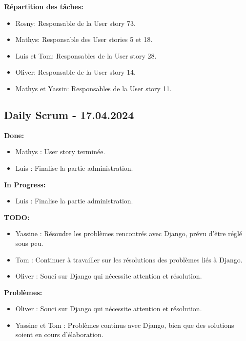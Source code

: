 \documentclass[11pt]{article}
\begin{document}
\textbf{Répartition des tâches:}
\begin{itemize}
    \item Rosny: Responsable de la User story 73.
    \item Mathys: Responsable des User stories 5 et 18.
    \item Luis et Tom: Responsables de la User story 28.
    \item Oliver: Responsable de la User story 14.
    \item Mathys et Yassin: Responsables de la User story 11.
\end{itemize}


\subsection*{{\color{navy}Daily Scrum - 17.04.2024}}

\textbf{Done:}
\begin{itemize}
  \item Mathys : User story terminée.
  \item Luis : Finalise la partie administration.
\end{itemize}

\textbf{In Progress:}
\begin{itemize}
  \item Luis : Finalise la partie administration.
\end{itemize}

\textbf{TODO:}
\begin{itemize}
  \item Yassine : Résoudre les problèmes rencontrés avec Django, prévu d'être réglé sous peu.
  \item Tom : Continuer à travailler sur les résolutions des problèmes liés à Django.
  \item Oliver : Souci sur Django qui nécessite attention et résolution.
\end{itemize}

\textbf{Problèmes:}
\begin{itemize}
  \item Oliver : Souci sur Django qui nécessite attention et résolution.
  \item Yassine et Tom : Problèmes continus avec Django, bien que des solutions soient en cours d'élaboration.
\end{itemize}
\end{document}
